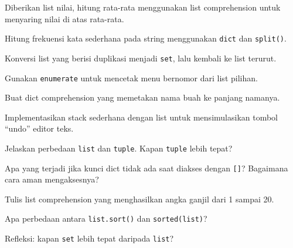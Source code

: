 \documentclass[../main.tex]{subfiles}
\begin{document}
\begin{aktivitas}
  \item Diberikan list nilai, hitung rata-rata menggunakan list comprehension untuk menyaring nilai di atas rata-rata.
  \item Hitung frekuensi kata sederhana pada string menggunakan \texttt{dict} dan \texttt{split()}.
  \item Konversi list yang berisi duplikasi menjadi \texttt{set}, lalu kembali ke list terurut.
  \item Gunakan \texttt{enumerate} untuk mencetak menu bernomor dari list pilihan.
  \item Buat dict comprehension yang memetakan nama buah ke panjang namanya.
  \item Implementasikan stack sederhana dengan list untuk mensimulasikan tombol ``undo'' editor teks.
\end{aktivitas}

\begin{latihan}
  \item Jelaskan perbedaan \texttt{list} dan \texttt{tuple}. Kapan \texttt{tuple} lebih tepat?
  \item Apa yang terjadi jika kunci dict tidak ada saat diakses dengan \texttt{[]}? Bagaimana cara aman mengaksesnya?
  \item Tulis list comprehension yang menghasilkan angka ganjil dari 1 sampai 20.
  \item Apa perbedaan antara \texttt{list.sort()} dan \texttt{sorted(list)}?
  \item Refleksi: kapan \texttt{set} lebih tepat daripada \texttt{list}?
\end{latihan}
\end{document}
